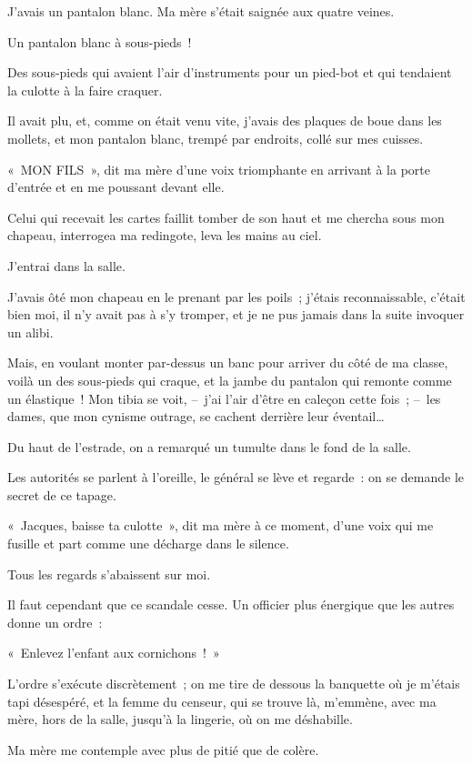 \documentclass[french,twoside]{book} %
\begin{document}
J’avais un pantalon blanc. Ma mère s’était saignée aux quatre veines.\par
Un pantalon blanc à sous-pieds !\par
Des sous-pieds qui avaient l’air d’instruments pour un pied-bot et qui tendaient la culotte à la faire craquer.\par
Il avait plu, et, comme on était venu vite, j’avais des plaques de boue dans les mollets, et mon pantalon blanc, trempé par endroits, collé sur mes cuisses.\par
« MON FILS », dit ma mère d’une voix triomphante en arrivant à la porte d’entrée et en me poussant devant elle.\par
Celui qui recevait les cartes faillit tomber de son haut et me chercha sous mon chapeau, interrogea ma redingote, leva les mains au ciel.\par
\bigbreak
\noindent J’entrai dans la salle.\par
J’avais ôté mon chapeau en le prenant par les poils ; j’étais reconnaissable, c’était bien moi, il n’y avait pas à s’y tromper, et je ne pus jamais dans la suite invoquer un alibi.\par
Mais, en voulant monter par-dessus un banc pour arriver du côté de ma classe, voilà un des sous-pieds qui craque, et la jambe du pantalon qui remonte comme un élastique ! Mon tibia se voit, – j’ai l’air d’être en caleçon cette fois ; – les dames, que mon cynisme outrage, se cachent derrière leur éventail…\par
Du haut de l’estrade, on a remarqué un tumulte dans le fond de la salle.\par
Les autorités se parlent à l’oreille, le général se lève et regarde : on se demande le secret de ce tapage.\par
« Jacques, baisse ta culotte », dit ma mère à ce moment, d’une voix qui me fusille et part comme une décharge dans le silence.\par
Tous les regards s’abaissent sur moi.\par
Il faut cependant que ce scandale cesse. Un officier plus énergique que les autres donne un ordre :\par
« Enlevez l’enfant aux cornichons ! »\par
\bigbreak
\noindent L’ordre s’exécute discrètement ; on me tire de dessous la banquette où je m’étais tapi désespéré, et la femme du censeur, qui se trouve là, m’emmène, avec ma mère, hors de la salle, jusqu’à la lingerie, où on me déshabille.\par
Ma mère me contemple avec plus de pitié que de colère.\par
\end{document}
